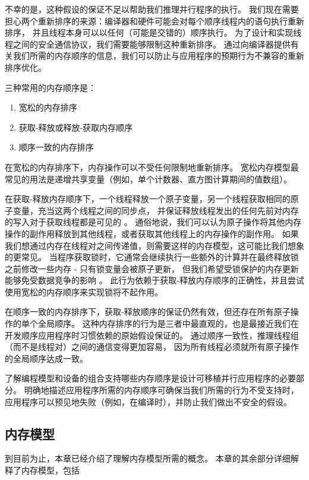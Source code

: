 不幸的是，这种假设的保证不足以帮助我们推理并行程序的执行。 
我们现在需要担心两个重新排序的来源：编译器和硬件可能会对每个顺序线程内的语句执行重新排序，
并且线程本身可以以任何（可能是交错的）顺序执行。 
为了设计和实现线程之间的安全通信协议，我们需要能够限制这种重新排序。 
通过向编译器提供有关我们所需的内存顺序的信息，我们可以防止与应用程序的预期行为不兼容的重新排序优化。

三种常用的内存顺序是：

\begin{enumerate}
	\item 宽松的内存排序

	\item 获取-释放或释放-获取内存顺序

	\item 顺序一致的内存排序
\end{enumerate}

在宽松的内存排序下，内存操作可以不受任何限制地重新排序。 
宽松内存模型最常见的用法是递增共享变量（例如，单个计数器、直方图计算期间的值数组）。

在获取-释放内存顺序下，一个线程释放一个原子变量，另一个线程获取相同的原子变量，充当这两个线程之间的同步点，
并保证释放线程发出的任何先前对内存的写入对于获取线程都是可见的 。 
通俗地说，我们可以认为原子操作将其他内存操作的副作用释放到其他线程，或者获取其他线程上的内存操作的副作用。 
如果我们想通过内存在线程对之间传递值，则需要这样的内存模型，这可能比我们想象的更常见。 
当程序获取锁时，它通常会继续执行一些额外的计算并在最终释放锁之前修改一些内存 - 只有锁变量会被原子更新，
但我们希望受锁保护的内存更新能够免受数据竞争的影响 。 
此行为依赖于获取-释放内存顺序的正确性，并且尝试使用宽松的内存顺序来实现锁将不起作用。

在顺序一致的内存排序下，获取-释放顺序的保证仍然有效，但还存在所有原子操作的单个全局顺序。 
这种内存排序的行为是三者中最直观的，也是最接近我们在开发顺序应用程序时习惯依赖的原始假设保证的。 
通过顺序一致性，推理线程组（而不是线程对）之间的通信变得更加容易，
因为所有线程必须就所有原子操作的全局顺序达成一致。

了解编程模型和设备的组合支持哪些内存顺序是设计可移植并行应用程序的必要部分。 
明确地描述应用程序所需的内存顺序可确保当我们所需的行为不受支持时，
应用程序可以预见地失败（例如，在编译时），并防止我们做出不安全的假设。

\subsection{内存模型}
到目前为止，本章已经介绍了理解内存模型所需的概念。 本章的其余部分详细解释了内存模型，包括

